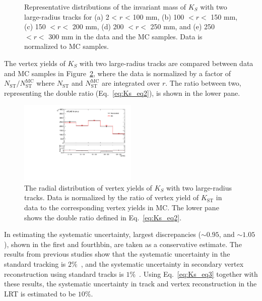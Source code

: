 \begin{figure}[!htb]
    \caption{Representative distributions of the invariant mass of $K_{S}$ with two large-radius tracks for (a) 2 < $r$ < 100 mm, (b) 100 $<r<$ 150 mm, (c) 150 $<r<$ 200 mm, (d) 200 $<r<$ 250 mm, and (e) 250 $<r<$ 300 mm in the data and the MC samples. Data is normalized to MC samples.}
    \label{fig:Ks_mass}
\end{figure}

The vertex yields of $K_{S}$ with two large-radius tracks are compared between data and MC samples in Figure~\ref{fig:Ks_double_ratio}, where the data is normalized by a factor of $N_{\mathrm{ST}} / N_{\mathrm{ST}}^{\mathrm{MC}}$ where $N_{\mathrm{ST}}$ and $N_{\mathrm{ST}}^{\mathrm{MC}}$ are integrated over $r$. The ratio between two, representing the double ratio (Eq.~\ref{eq:Ks_eq2}), is shown in the lower pane.

\begin{figure}[!htb]
	\includegraphics[width=0.50\textwidth]{figures/m_syst_Ks_ratio_R.pdf}
	\centering
	\caption{The radial distribution of vertex yields of $K_{S}$ with two large-radius tracks. Data is normalized by the ratio of vertex yield of $K_{\mathrm{ST}}$ in data to the corresponding vertex yields in MC. The lower pane shows the double ratio defined in Eq.~\ref{eq:Ks_eq2}.}
	\label{fig:Ks_double_ratio}
\end{figure}

In estimating the systematic uncertainty, largest discrepancies ($\sim0.95$, and $\sim1.05$), shown in the first and fourthbin, are taken as a conservative estimate. The results from previous studies show that the systematic uncertainty in the standard tracking is $2\%$~\cite{ATL-PHYS-PUB-2015-051}, and the systematic uncertainty in secondary vertex reconstruction using standard tracks is $1\%$~\cite{Aaboud:2215485}. Using Eq.~\ref{eq:Ks_eq3} together with these results, the systematic uncertainty in track and vertex reconstruction in the LRT is estimated to be $10\%$.




















